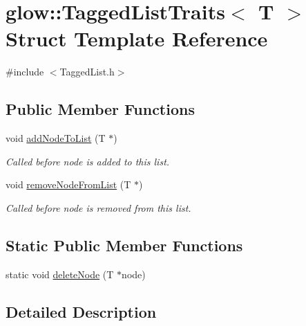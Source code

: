 \hypertarget{structglow_1_1_tagged_list_traits}{}\section{glow\+:\+:Tagged\+List\+Traits$<$ T $>$ Struct Template Reference}
\label{structglow_1_1_tagged_list_traits}


{\ttfamily \#include $<$Tagged\+List.\+h$>$}

\subsection*{Public Member Functions}
\begin{DoxyCompactItemize}
\item 
\mbox{\label{structglow_1_1_tagged_list_traits_aa761d00c1247c294c72c742fdcde6adf}} 
void \hyperlink{structglow_1_1_tagged_list_traits_aa761d00c1247c294c72c742fdcde6adf}{add\+Node\+To\+List} (T $\ast$)
\begin{DoxyCompactList}\small\item\em Called before node is added to this list. \end{DoxyCompactList}\item 
\mbox{\label{structglow_1_1_tagged_list_traits_a2d68adb690439d516e5c77c107b5d9f6}} 
void \hyperlink{structglow_1_1_tagged_list_traits_a2d68adb690439d516e5c77c107b5d9f6}{remove\+Node\+From\+List} (T $\ast$)
\begin{DoxyCompactList}\small\item\em Called before node is removed from this list. \end{DoxyCompactList}\end{DoxyCompactItemize}
\subsection*{Static Public Member Functions}
\begin{DoxyCompactItemize}
\item 
static void \hyperlink{structglow_1_1_tagged_list_traits_ab0384ec6c328482503d0ecf3cc8e7d05}{delete\+Node} (T $\ast$node)
\end{DoxyCompactItemize}


\subsection{Detailed Description}
